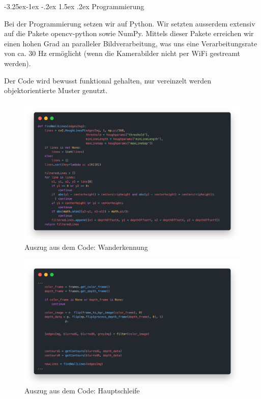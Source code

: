 \documentclass[a4paper]{scrarticle}
\makeatletter
\renewcommand\subsection{\@startsection{subsection}{2}{\z@}%
                                     {-3.25ex\@plus -1ex \@minus -.2ex}%
                                     {1.5ex \@plus .2ex}%
                                     {\Large\AKAfont}}
\makeatother
\begin{document}
\subsection{Programmierung}

Bei der Programmierung setzen wir auf Python. Wir setzten ausserdem extensiv auf die Pakete opencv-python sowie NumPy.
Mittels dieser Pakete erreichen wir einen hohen Grad an paralleler Bildverarbeitung, was uns eine Verarbeitungsrate von ca. 30 Hz ermöglicht (wenn die Kamerabilder nicht per WiFi gestreamt werden).

Der Code wird bewusst funktional gehalten, nur vereinzelt werden objektorientierte Muster genutzt.
\begin{figure}[ht]
\includegraphics[width=15cm]{findWallLines.png}
\caption{Auszug aus dem Code: Wanderkennung}
\end{figure}
\begin{figure}[ht]
\includegraphics[width=15cm]{mainloop.png}
\caption{Auszug aus dem Code: Hauptschleife}
\end{figure}
\end{document}
